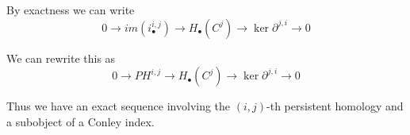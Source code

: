 By exactness we can write 
\[
0\to im(i_\bullet^{i,j}) \to H_\bullet(C^j)\to \ker \partial^{j,i}\to 0
\]

We can rewrite this as
\[
0\to PH^{i,j} \to H_\bullet(C^j)\to \ker \partial^{j,i}\to 0
\]

Thus we have an exact sequence involving the $(i,j)$-th persistent homology and a subobject of a Conley index.

%
%
%
%
%
%
%
%
%
%
